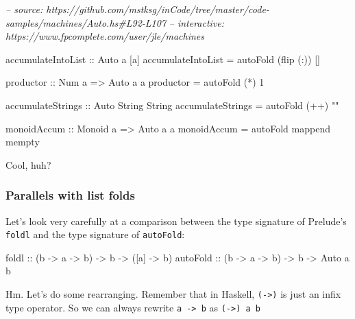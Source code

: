 \documentclass[]{article}
\newenvironment{Shaded}{}{}
\newcommand{\CommentTok}[1]{\textcolor[rgb]{0.38,0.63,0.69}{\textit{#1}}}
\newcommand{\DataTypeTok}[1]{\textcolor[rgb]{0.56,0.13,0.00}{#1}}
\newcommand{\DecValTok}[1]{\textcolor[rgb]{0.25,0.63,0.44}{#1}}
\newcommand{\FunctionTok}[1]{\textcolor[rgb]{0.02,0.16,0.49}{#1}}
\newcommand{\NormalTok}[1]{#1}
\newcommand{\OtherTok}[1]{\textcolor[rgb]{0.00,0.44,0.13}{#1}}
\newcommand{\StringTok}[1]{\textcolor[rgb]{0.25,0.44,0.63}{#1}}
\begin{document}
\begin{Shaded}
\begin{Highlighting}[]
\CommentTok{-- source: https://github.com/mstksg/inCode/tree/master/code-samples/machines/Auto.hs#L92-L107}
\CommentTok{-- interactive: https://www.fpcomplete.com/user/jle/machines}

\OtherTok{accumulateIntoList ::} \DataTypeTok{Auto}\NormalTok{ a [a]}
\NormalTok{accumulateIntoList }\FunctionTok{=}\NormalTok{ autoFold (flip (}\FunctionTok{:}\NormalTok{)) []}

\OtherTok{productor ::} \DataTypeTok{Num}\NormalTok{ a }\OtherTok{=>} \DataTypeTok{Auto}\NormalTok{ a a}
\NormalTok{productor }\FunctionTok{=}\NormalTok{ autoFold (}\FunctionTok{*}\NormalTok{) }\DecValTok{1}

\OtherTok{accumulateStrings ::} \DataTypeTok{Auto} \DataTypeTok{String} \DataTypeTok{String}
\NormalTok{accumulateStrings }\FunctionTok{=}\NormalTok{ autoFold (}\FunctionTok{++}\NormalTok{) }\StringTok{""}

\OtherTok{monoidAccum ::} \DataTypeTok{Monoid}\NormalTok{ a }\OtherTok{=>} \DataTypeTok{Auto}\NormalTok{ a a}
\NormalTok{monoidAccum }\FunctionTok{=}\NormalTok{ autoFold mappend mempty}
\end{Highlighting}
\end{Shaded}

Cool, huh?

\hypertarget{parallels-with-list-folds}{%
\subsubsection{Parallels with list folds}\label{parallels-with-list-folds}}

Let's look very carefully at a comparison between the type signature of
Prelude's \texttt{foldl} and the type signature of \texttt{autoFold}:

\begin{Shaded}
\begin{Highlighting}[]
\NormalTok{foldl}\OtherTok{      ::}\NormalTok{ (b }\OtherTok{->}\NormalTok{ a }\OtherTok{->}\NormalTok{ b) }\OtherTok{->}\NormalTok{ b }\OtherTok{->}\NormalTok{ ([a] }\OtherTok{->}\NormalTok{ b)}
\OtherTok{autoFold   ::}\NormalTok{ (b }\OtherTok{->}\NormalTok{ a }\OtherTok{->}\NormalTok{ b) }\OtherTok{->}\NormalTok{ b }\OtherTok{->}  \DataTypeTok{Auto}\NormalTok{ a b}
\end{Highlighting}
\end{Shaded}

Hm. Let's do some rearranging. Remember that in Haskell,
\texttt{(-\textgreater{})} is just an infix type operator. So we can always
rewrite \texttt{a\ -\textgreater{}\ b} as \texttt{(-\textgreater{})\ a\ b}
\end{document}
